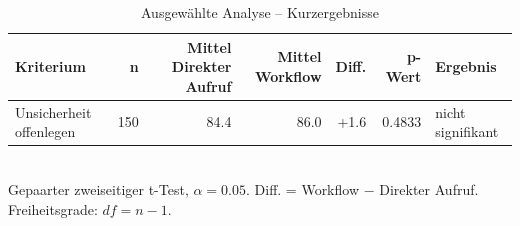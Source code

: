 \begin{table}[htbp]
\centering
\caption{Ausgewählte Analyse -- Kurzergebnisse}
\begin{tabular}{lrrrrrl}
\toprule
Kriterium & n & Mittel Direkter Aufruf & Mittel Workflow & Diff. & p-Wert & Ergebnis \\
\midrule
Unsicherheit offenlegen & 150 & 84.4 & 86.0 & +1.6 & 0.4833 & nicht signifikant \\
\bottomrule
\end{tabular}
\\[2mm]
\footnotesize Gepaarter zweiseitiger t-Test, $\alpha=0.05$. Diff. = Workflow $-$ Direkter Aufruf. Freiheitsgrade: $df=n-1$.
\end{table}

